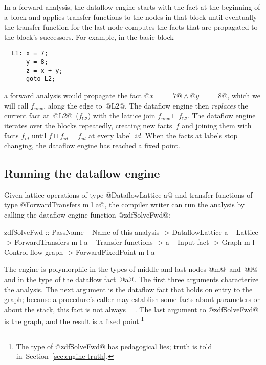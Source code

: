 \documentclass[blockstyle,preprint,nocopyrightspace]{sigplanconf}
\newcommand\join{\sqcup}
\newcommand{\authornote}[1]{{\em #1}}
\def\authornote#1{\unskip\relax}
\newcommand{\norman}[1]{\authornote{NR: #1}}
\let\remark\norman
\newcommand\secref[1]{Section~\ref{sec:#1}}
\newcommand\seclabel[1]{\label{sec:#1}}
\begin{document}
In a forward analysis, the dataflow engine starts with the fact at the
beginning of a block and applies transfer functions to the nodes in
that block until eventually the transfer function for the last node
computes the facts that are propagated to the block's successors.
For example, in the basic block
\begin{verbatim}
  L1: x = 7;
      y = 8;
      z = x + y;
      goto L2;
\end{verbatim}
a forward analysis would propagate the fact 
$@x == 7@ \land @y == 8@$, which we will call $f_{\mathit{new}}$,
along the edge to~@L2@. 
The dataflow engine then \emph{replaces} the current fact
at~@L2@~($f_{\mathtt{L2}}$) with the lattice join $f_{\mathit{new}}
\join f_{\mathtt{L2}}$. 
The dataflow engine iterates over the blocks repeatedly, creating new
facts~$f$ and joining them with facts $f_{\mathit{id}}$ until
\mbox{$f \join f_{\mathit{id}} = f_{\mathit{id}}$} at every label~$\mathit{id}$.
When the facts at labels stop changing, the dataflow
engine has reached a fixed point.



\subsection{Running the dataflow engine}

\seclabel{zdfSolveFwd}

Given lattice operations of type @DataflowLattice a@
and transfer functions of type @ForwardTransfers m l a@,
the compiler writer can run the analysis by calling the
dataflow-engine function @zdfSolveFwd@:
\begin{code}
 zdfSolveFwd 
  :: PassName               -- Name of this analysis
  -> DataflowLattice a      -- Lattice
  -> ForwardTransfers m l a -- Transfer functions
  -> a                      -- Input fact
  -> Graph m l              -- Control-flow graph
  -> ForwardFixedPoint m l a
\end{code}
The engine is polymorphic in the types of middle and last nodes
@m@~and~@l@ and in the type of the dataflow fact~@a@.
The first three arguments characterize the analysis.
The next argument is the dataflow fact that holds on entry to the
graph;
because a procedure's caller may establish some facts about
parameters or about the stack,
this fact
is not always~$\bot$.
The last argument to @zdfSolveFwd@ is the graph, and the result is a 
fixed point.\footnote
{The type of @zdfSolveFwd@ has pedagogical lies;
truth is told in~\secref{engine-truth}.}
\end{document}
